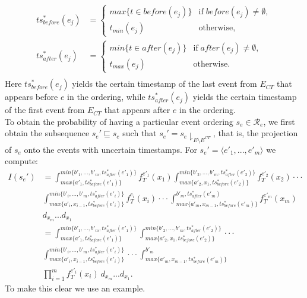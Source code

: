 \begin{itemize}
\begin{align*}
ts^*_{before}(e_j) &= \begin{cases}
	max\{t \in before(e_j)\} & \mbox{if} \; before(e_j) \neq \emptyset,\\
	t_{min}(e_j) & \mbox{otherwise}, \; 
	\end{cases} \\
ts^*_{after}(e_j) &= \begin{cases}
	min\{t \in after(e_j)\} & \mbox{if} \; after(e_j) \neq \emptyset,\\
	t_{max}(e_j) & \mbox{otherwise}. \; 
	\end{cases} \\
\end{align*}
Here $ts^*_{before}(e_j)$ yields the certain timestamp of the last event from $E_{CT}$ that appears before $e$ in the ordering, while $ts^*_{after}(e_j)$ yields the certain timestamp of the first event from $E_{CT}$ that appears after $e$ in the ordering.\\
To obtain the probability of having a particular event ordering $s_e \in \mathcal{R}_e$, we first obtain the subsequence $s_e'\sqsubseteq s_e$ such that $s_e' = s_e \downharpoonright_{E \setminus E^{CT}}$, that is, the projection of $s_e$ onto the events with uncertain timestamps.
For $s_e'=\langle e'_1,...,e'_m \rangle$ we compute:
\begin{align*}
I(s_e') &= \int_{max\{a'_1,ts^*_{before}(e'_1)\}}^{min\{b'_1,...,b'_m,ts^*_{after}(e'_1)\}} f_T^{e'_1}(x_1)
\int_{max\{a'_2,x_1,ts^*_{before}(e'_2)\}}^{min\{b'_2,...,b'_m,ts^*_{after}(e'_2)\}} f_T^{e'_2}(x_2)
\cdot \cdot \cdot \\
&
\int_{max\{a'_i,x_{i-1},ts^*_{before}(e'_i)\}}^{min\{b'_i,...,b'_m,ts^*_{after}(e'_i)\}} f_T^{e_i}(x_i)
\cdot \cdot \cdot 
\int_{max\{a'_m,x_{m-1},ts^*_{before}(e'_m)\}}^{b'_m,ts^*_{after}(e'_m)} f_T^{e'_m}(x_m) ~\\
&
d_{x_m} ... d_{x_1} \\
&=
\int_{max\{a'_1, ts^*_{before}(e'_1)\}}^{min\{b'_1,...,b'_m,ts^*_{after}(e'_1)\}}
\int_{max\{a'_2,x_1,ts^*_{before}(e'_2)\}}^{min\{b'_2,...,b'_m,ts^*_{after}(e'_2)\}}
\cdot \cdot \cdot \\
&
\int_{max\{a'_i,x_{i-1},ts^*_{before}(e'_i)\}}^{min\{b'_i,...,b'_m,ts^*_{after}(e'_i)\}}
\cdot \cdot \cdot 
\int_{max\{a'_m,x_{m-1},ts^*_{before}(e'_m)\}}^{b'_m} \\
&
\prod_{i=1}^{m} f_T^{e'_i}(x_i) ~
d_{x_m} ... d_{x_1}.
\end{align*}
To make this clear we use an example.

\end{itemize}
